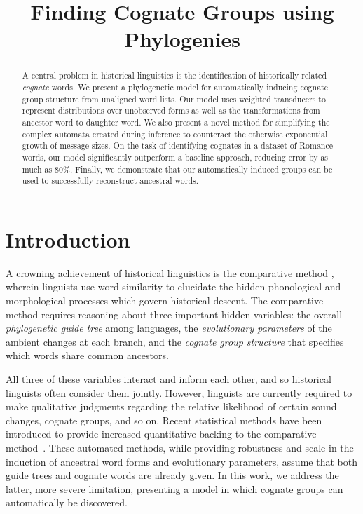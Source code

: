 \documentclass[11pt,a4paper]{article}
\title{Finding Cognate Groups using Phylogenies}
\author{}
\date{}
\begin{document}
\maketitle
\begin{abstract}
  A central problem in historical linguistics is the identification
  of historically related \emph{cognate} words.  We present a
  phylogenetic model for automatically inducing cognate group
  structure from unaligned word lists.  Our model uses weighted
  transducers to represent distributions over unobserved forms as
  well as the transformations from ancestor word to daughter word.
  We also present a novel method for simplifying the complex automata
  created during inference to counteract the otherwise exponential
  growth of message sizes. On the task of identifying cognates
  in a dataset of Romance words, our model significantly outperform
  a baseline approach, reducing error by as much as 80\%.  Finally,
  we demonstrate that our automatically induced groups can be used
  to successfully reconstruct ancestral words.
\end{abstract}
\section{Introduction}

A crowning achievement of historical linguistics is the comparative
method \cite{ohala93phonetics}, wherein linguists use word similarity
to elucidate the hidden phonological and morphological processes
which govern historical descent. The comparative method requires
reasoning about three important hidden variables: the overall
\emph{phylogenetic guide tree} among languages, the \emph{evolutionary
parameters} of the ambient changes at each branch, and the \emph{cognate
group structure} that specifies which words share common ancestors.

All three of these variables interact and inform each other, and
so historical linguists often consider them jointly.  However,
linguists are currently required to make qualitative judgments
regarding the relative likelihood of certain sound changes, cognate
groups, and so on.  Recent statistical methods have been introduced
to provide increased quantitative backing to the comparative
method~\cite{oakes00computer,bouchard07probabilistic,bouchard09improved}.
These automated methods, while providing robustness and scale in
the induction of ancestral word forms and evolutionary parameters,
assume that both guide trees and cognate words are already given.
In this work, we address the latter, more severe limitation,
presenting a model in which cognate groups can automatically be
discovered.
\end{document}
